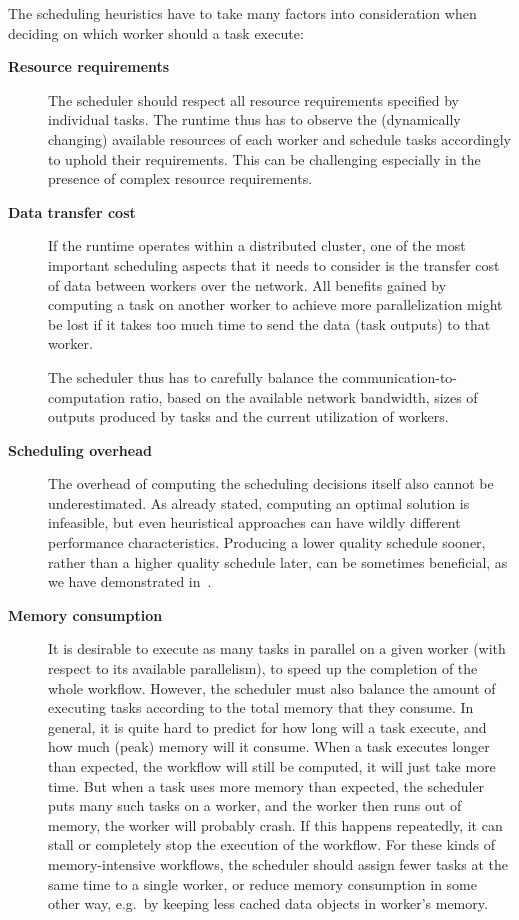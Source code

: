 The scheduling heuristics have to take many factors into consideration when deciding on which
worker should a task execute:

\begin{description}
    \item[\textbf{Resource requirements}] The scheduler should respect all resource requirements specified by individual tasks. The runtime
    thus has to observe the (dynamically changing) available resources of each worker and schedule
    tasks accordingly to uphold their requirements. This can be challenging especially in the presence
    of complex resource requirements.
    \item[\textbf{Data transfer cost}] If the runtime operates within a distributed cluster, one of the most important scheduling aspects
    that it needs to consider is the transfer cost of data between workers over the network. All
    benefits gained by computing a task on another worker to achieve more parallelization might be lost
    if it takes too much time to send the data (task outputs) to that worker.

    The scheduler thus has to carefully balance the communication-to-computation ratio, based on the
    available network bandwidth, sizes of outputs produced by tasks and the current utilization of
    workers.
    \item[\textbf{Scheduling overhead}] The overhead of computing the scheduling decisions itself also cannot be underestimated. As already
    stated, computing an optimal solution is infeasible, but even heuristical approaches can have
    wildly different performance characteristics. Producing a lower quality schedule sooner, rather
    than a higher quality schedule later, can be sometimes beneficial, as we have demonstrated
    in~\cite{estee, rsds}.
    \item[\textbf{Memory consumption}] It is desirable to execute as many tasks in parallel on a given worker (with respect to its
    available parallelism), to speed up the completion of the whole workflow. However, the scheduler
    must also balance the amount of executing tasks according to the total memory that they consume. In
    general, it is quite hard to predict for how long will a task execute, and how much (peak) memory
    will it consume. When a task executes longer than expected, the workflow will still be computed, it
    will just take more time. But when a task uses more memory than expected, the scheduler puts many
    such tasks on a worker, and the worker then runs out of memory, the worker will probably crash. If
    this happens repeatedly, it can stall or completely stop the execution of the workflow. For these
    kinds of memory-intensive workflows, the scheduler should assign fewer tasks at the same time to a
    single worker, or reduce memory consumption in some other way, e.g.\ by keeping less cached data
    objects in worker's memory.
\end{description}
